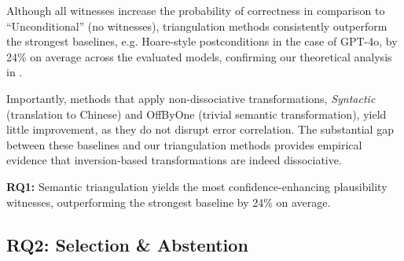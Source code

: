 \documentclass[acmsmall,screen,nonacm]{acmart}
\begin{document}
Although all witnesses increase the probability of correctness in comparison to ``Unconditional'' (no witnesses), triangulation methods consistently outperform the strongest baselines, e.g. Hoare-style postconditions in the case of GPT-4o, by 24\% on average across the evaluated models, confirming our theoretical analysis in . 

Importantly, methods that apply non-dissociative transformations, \emph{Syntactic} (translation to Chinese) and OffByOne (trivial semantic transformation), yield little improvement, as they do not disrupt error correlation. The substantial gap between these baselines and our triangulation methods provides empirical evidence that inversion-based transformations are indeed dissociative.

\begin{tcolorbox}[colback=gray!5, colframe=black!20, arc=2pt, boxrule=0.3mm, breakable, sharp corners, left=2pt, right=2pt, top=2pt, bottom=2pt]
\textbf{RQ1:} Semantic triangulation yields the most confidence-enhancing plausibility witnesses, outperforming the strongest baseline by 24\% on average.
\end{tcolorbox}

\subsection{RQ2: Selection \& Abstention}
\end{document}
